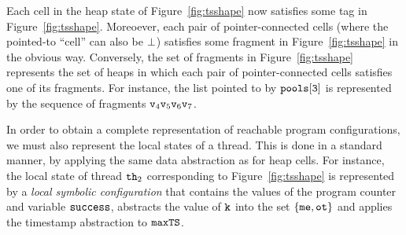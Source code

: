 
Each cell in the heap state of Figure~\ref{fig:tsshape} now satisfies
some tag in Figure~\ref{fig:tsshape}. Moreoever, each pair of pointer-connected
cells (where the pointed-to ``cell'' can also be $\bot$)
satisfies some fragment in Figure~\ref{fig:tsshape} in the obvious way.
Conversely, the set of fragments in
Figure~\ref{fig:tsshape} represents the set of heaps in which each pair of
pointer-connected cells satisfies one of its fragments. For instance, the
list pointed to by $\tt pools[3]$ is represented by the sequence of
fragments $\mathtt{v}_4 \mathtt{v}_5 \mathtt{v}_6 \mathtt{v}_7$.

In order to obtain a complete representation of reachable program configurations,
we must also represent the local states of a thread. This is done in a standard
manner, by applying the same data abstraction as for heap cells. For instance,
the local state of thread ${\tt th}_2$ corresponding to
Figure~\ref{fig:tsshape} is represented by a {\em local symbolic configuration}
that contains the values of the program counter and variable $\tt success$,
abstracts the value of ${\tt k}$ into the set $\left\{{\tt me},{\tt ot}\right\}$ and
applies the timestamp abstraction to ${\tt maxTS}$.




